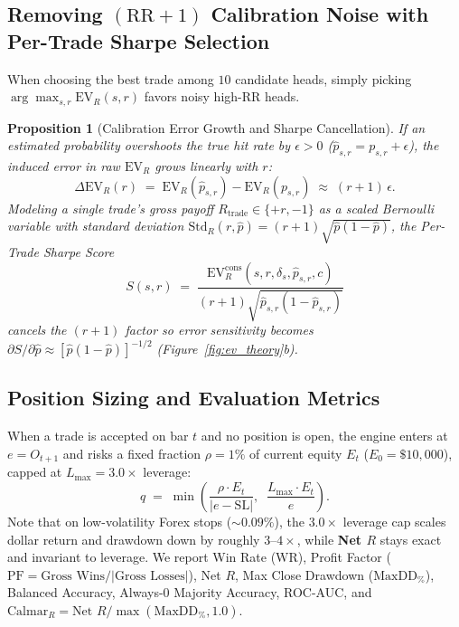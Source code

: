 \documentclass{article}
\newtheorem{proposition}{Proposition}
\newcommand{\EVR}{\mathrm{EV}_R}
\newcommand{\StdR}{\mathrm{Std}_R}
\newcommand{\RR}{\mathrm{RR}}
\newcommand{\SL}{\mathrm{SL}}
\newcommand{\PF}{\mathrm{PF}}
\begin{document}
\subsection{Removing \texorpdfstring{$(\RR+1)$}{(RR+1)} Calibration Noise with Per-Trade Sharpe Selection}

When choosing the best trade among $10$ candidate heads, simply picking $\arg\max_{s,r} \EVR(s,r)$ favors noisy high-$\RR$ heads.

\begin{proposition}[Calibration Error Growth and Sharpe Cancellation]
\label{prop:sharpe}
If an estimated probability overshoots the true hit rate by $\epsilon > 0$ ($\hat{p}_{s,r} = p_{s,r} + \epsilon$), the induced error in raw $\EVR$ grows linearly with $r$:
\begin{equation}
  \Delta \EVR(r) \;=\; \EVR(\hat{p}_{s,r}) - \EVR(p_{s,r}) \;\approx\; (r + 1)\,\epsilon.
  \label{eq:ev_noise}
\end{equation}
Modeling a single trade's gross payoff $R_{\mathrm{trade}} \in \{+r, -1\}$ as a scaled Bernoulli variable with standard deviation $\StdR(r, \hat{p}) = (r + 1)\sqrt{\hat{p}(1-\hat{p})}$, the \emph{Per-Trade Sharpe Score}
\begin{equation}
  S(s, r) \;=\; \frac{\EVR^{\mathrm{cons}}(s, r, \delta_s, \hat{p}_{s,r}, c)}{(r + 1)\sqrt{\hat{p}_{s,r}(1 - \hat{p}_{s,r})}}
  \label{eq:sharpe_score}
\end{equation}
cancels the $(r+1)$ factor so error sensitivity becomes $\partial S / \partial \hat{p} \approx [\hat{p}(1-\hat{p})]^{-1/2}$ (Figure~\ref{fig:ev_theory}b).
\end{proposition}

\subsection{Position Sizing and Evaluation Metrics}

When a trade is accepted on bar $t$ and no position is open, the engine enters at $e = O_{t+1}$ and risks a fixed fraction $\rho = 1\%$ of current equity $E_t$ ($E_0 = \$10{,}000$), capped at $L_{\max} = 3.0\times$ leverage:
\begin{equation}
  q \;=\; \min\!\left(\frac{\rho \cdot E_t}{|e - \SL|},\;\; \frac{L_{\max} \cdot E_t}{e}\right).
  \label{eq:sizing}
\end{equation}
Note that on low-volatility Forex stops ($\sim 0.09\%$), the $3.0\times$ leverage cap scales dollar return and drawdown down by roughly $3$--$4\times$, while \textbf{Net $R$} stays exact and invariant to leverage. We report Win Rate ($\mathrm{WR}$), Profit Factor ($\PF = \text{Gross Wins} / |\text{Gross Losses}|$), Net $R$, Max Close Drawdown ($\mathrm{MaxDD}_\%$), Balanced Accuracy, Always-0 Majority Accuracy, ROC-AUC, and $\mathrm{Calmar}_R = \text{Net }R / \max(\mathrm{MaxDD}_\%, 1.0)$.
\end{document}

